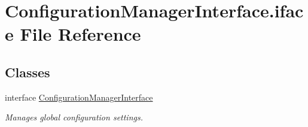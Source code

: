 \hypertarget{ConfigurationManagerInterface_8iface}{\section{Configuration\-Manager\-Interface.\-iface File Reference}
\label{ConfigurationManagerInterface_8iface}
}
\subsection*{Classes}
\begin{DoxyCompactItemize}
\item 
interface \hyperlink{interfaceConfigurationManagerInterface}{Configuration\-Manager\-Interface}
\begin{DoxyCompactList}\small\item\em Manages global configuration settings. \end{DoxyCompactList}\end{DoxyCompactItemize}
